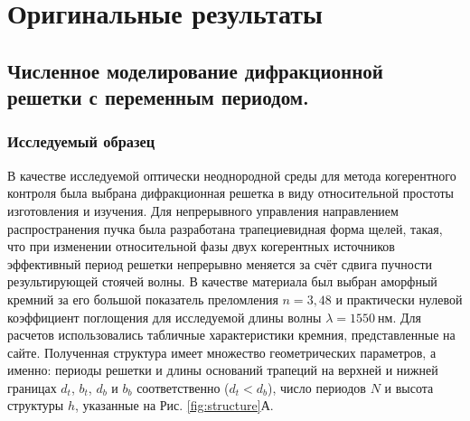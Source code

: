 \chapter{Оригинальные результаты}

\section{Численное моделирование дифракционной решетки с переменным периодом.}

\subsection{Исследуемый образец}
В качестве исследуемой оптически неоднородной среды для метода когерентного контроля была выбрана дифракционная решетка в виду относительной простоты изготовления и изучения. Для непрерывного управления направлением распространения пучка была разработана трапециевидная форма щелей, такая, что при изменении относительной фазы двух когерентных источников эффективный период решетки непрерывно меняется за счёт сдвига пучности результирующей стоячей волны. В качестве материала был выбран аморфный кремний за его большой показатель преломления $n = 3,48$ и практически нулевой коэффициент поглощения для исследуемой длины волны $\lambda = 1550\ \text{нм}$. Для расчетов использовались табличные характеристики кремния, представленные на сайте\cite{refractiveIndex}. Полученная структура имеет множество геометрических параметров, а именно: периоды решетки и длины оснований трапеций на верхней и нижней границах $d_t$, $b_t$, $d_b$ и $b_b$ соответственно ($d_t < d_b$), число периодов $N$ и высота структуры $h$, указанные на Рис. \ref{fig:structure}А.

